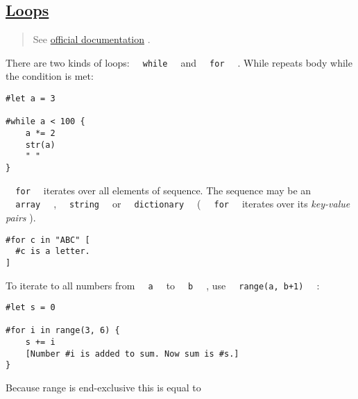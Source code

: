 \subsection{\texorpdfstring{\hyperref[loops]{Loops}}{Loops}}\label{loops}

\begin{quote}
See \href{https://typst.app/docs/reference/scripting/\#loops}{official
documentation} .
\end{quote}

There are two kinds of loops: \texttt{\ }{\texttt{\ while\ }}\texttt{\ }
and \texttt{\ }{\texttt{\ for\ }}\texttt{\ } . While repeats body while
the condition is met:

\begin{verbatim}
#let a = 3

#while a < 100 {
    a *= 2
    str(a)
    " "
}
\end{verbatim}

\pandocbounded{}

\texttt{\ }{\texttt{\ for\ }}\texttt{\ } iterates over all elements of
sequence. The sequence may be an
\texttt{\ }{\texttt{\ array\ }}\texttt{\ } ,
\texttt{\ }{\texttt{\ string\ }}\texttt{\ } or
\texttt{\ }{\texttt{\ dictionary\ }}\texttt{\ } (
\texttt{\ }{\texttt{\ for\ }}\texttt{\ } iterates over its
\emph{key-value pairs} ).

\begin{verbatim}
#for c in "ABC" [
  #c is a letter.
]
\end{verbatim}

\pandocbounded{}

To iterate to all numbers from \texttt{\ }{\texttt{\ a\ }}\texttt{\ } to
\texttt{\ }{\texttt{\ b\ }}\texttt{\ } , use
\texttt{\ }{\texttt{\ range(a,\ b+1)\ }}\texttt{\ } :

\begin{verbatim}
#let s = 0

#for i in range(3, 6) {
    s += i
    [Number #i is added to sum. Now sum is #s.]
}
\end{verbatim}

\pandocbounded{}

Because range is end-exclusive this is equal to

